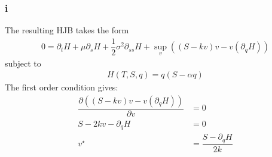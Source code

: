 \documentclass{article}
\begin{document}
\subsubsection*{i}
The resulting HJB takes the form 
\begin{equation*}
    \begin{split}
        0 = \partial_{t} H + \mu \partial_{s} H + \dfrac{1}{2} \sigma^2 \partial_{ss} H + \sup_{v}((S-kv)v - v(\partial_{q} H))
    \end{split}
\end{equation*}
subject to 
\begin{equation*}
    \begin{split}
        H(T,S,q) =q(S - \alpha q)
    \end{split}
\end{equation*}
The first order condition gives: 
\begin{equation*}
    \begin{split}
       \dfrac{\partial((S-kv)v - v(\partial_{q} H))}{\partial v} &=0\\
       S - 2kv - \partial_{q} H &=0\\
       v^{\star} &= \dfrac{S - \partial_{q} H }{2k}\\
    \end{split}
\end{equation*}
\end{document}
